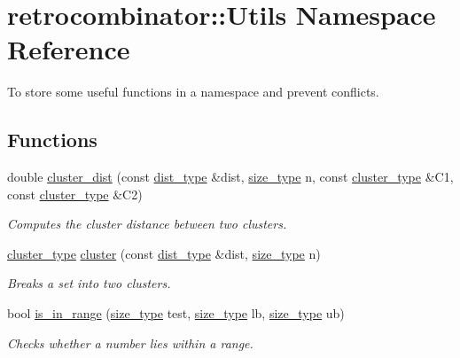 \hypertarget{namespaceretrocombinator_1_1Utils}{}\section{retrocombinator\+:\+:Utils Namespace Reference}
\label{namespaceretrocombinator_1_1Utils}


To store some useful functions in a namespace and prevent conflicts.  


\subsection*{Functions}
\begin{DoxyCompactItemize}
\item 
double \hyperlink{namespaceretrocombinator_1_1Utils_a75c34419887242476ac8219dfb981459}{cluster\+\_\+dist} (const \hyperlink{namespaceretrocombinator_aa416b6a3a9e444eae3309a16b8607750}{dist\+\_\+type} \&dist, \hyperlink{namespaceretrocombinator_a8e1541b50cee66a791df4c437ccbb385}{size\+\_\+type} n, const \hyperlink{namespaceretrocombinator_a316667a6633d664fe892bd7e0eb0141e}{cluster\+\_\+type} \&C1, const \hyperlink{namespaceretrocombinator_a316667a6633d664fe892bd7e0eb0141e}{cluster\+\_\+type} \&C2)
\begin{DoxyCompactList}\small\item\em Computes the cluster distance between two clusters. \end{DoxyCompactList}\item 
\hyperlink{namespaceretrocombinator_a316667a6633d664fe892bd7e0eb0141e}{cluster\+\_\+type} \hyperlink{namespaceretrocombinator_1_1Utils_a03dcc302a7444a0c0897ea1b306e69ef}{cluster} (const \hyperlink{namespaceretrocombinator_aa416b6a3a9e444eae3309a16b8607750}{dist\+\_\+type} \&dist, \hyperlink{namespaceretrocombinator_a8e1541b50cee66a791df4c437ccbb385}{size\+\_\+type} n)
\begin{DoxyCompactList}\small\item\em Breaks a set into two clusters. \end{DoxyCompactList}\item 
bool \hyperlink{namespaceretrocombinator_1_1Utils_a984680ddd6d1f7ccee9e0f040ff16183}{is\+\_\+in\+\_\+range} (\hyperlink{namespaceretrocombinator_a8e1541b50cee66a791df4c437ccbb385}{size\+\_\+type} test, \hyperlink{namespaceretrocombinator_a8e1541b50cee66a791df4c437ccbb385}{size\+\_\+type} lb, \hyperlink{namespaceretrocombinator_a8e1541b50cee66a791df4c437ccbb385}{size\+\_\+type} ub)
\begin{DoxyCompactList}\small\item\em Checks whether a number lies within a range. \end{DoxyCompactList}\end{DoxyCompactItemize}


